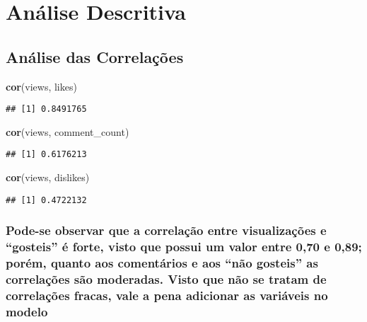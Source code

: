 \documentclass[]{article}
\newenvironment{Shaded}{\begin{snugshade}}{\end{snugshade}}
\newcommand{\KeywordTok}[1]{\textcolor[rgb]{0.13,0.29,0.53}{\textbf{#1}}}
\newcommand{\NormalTok}[1]{#1}
\begin{document}
\hypertarget{analise-descritiva}{%
\section{Análise Descritiva}\label{analise-descritiva}}

\hypertarget{analise-das-correlacoes}{%
\subsection{Análise das Correlações}\label{analise-das-correlacoes}}

\begin{Shaded}
\begin{Highlighting}[]
  \KeywordTok{cor}\NormalTok{(views, likes)}
\end{Highlighting}
\end{Shaded}

\begin{verbatim}
## [1] 0.8491765
\end{verbatim}

\begin{Shaded}
\begin{Highlighting}[]
  \KeywordTok{cor}\NormalTok{(views, comment_count)}
\end{Highlighting}
\end{Shaded}

\begin{verbatim}
## [1] 0.6176213
\end{verbatim}

\begin{Shaded}
\begin{Highlighting}[]
  \KeywordTok{cor}\NormalTok{(views, dislikes)}
\end{Highlighting}
\end{Shaded}

\begin{verbatim}
## [1] 0.4722132
\end{verbatim}

\hypertarget{pode-se-observar-que-a-correlacao-entre-visualizacoes-e-gosteis-e-forte-visto-que-possui-um-valor-entre-070-e-089-porem-quanto-aos-comentarios-e-aos-nao-gosteis-as-correlacoes-sao-moderadas.-visto-que-nao-se-tratam-de-correlacoes-fracas-vale-a-pena-adicionar-as-variaveis-no-modelo}{%
\subsubsection{Pode-se observar que a correlação entre visualizações e
``gosteis'' é forte, visto que possui um valor entre 0,70 e 0,89; porém,
quanto aos comentários e aos ``não gosteis'' as correlações são
moderadas. Visto que não se tratam de correlações fracas, vale a pena
adicionar as variáveis no
modelo}\label{pode-se-observar-que-a-correlacao-entre-visualizacoes-e-gosteis-e-forte-visto-que-possui-um-valor-entre-070-e-089-porem-quanto-aos-comentarios-e-aos-nao-gosteis-as-correlacoes-sao-moderadas.-visto-que-nao-se-tratam-de-correlacoes-fracas-vale-a-pena-adicionar-as-variaveis-no-modelo}}
\end{document}
